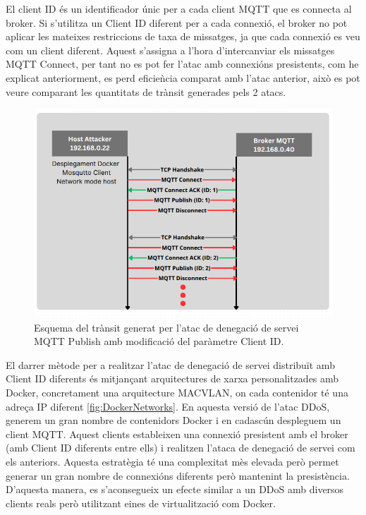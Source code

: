 El client ID és un identificador únic per a cada client MQTT que es connecta al broker. Si s'utilitza un Client ID diferent per a cada connexió, el broker no pot aplicar les mateixes restriccions de taxa de missatges, ja que cada connexió es veu com un client diferent. Aquest s'assigna a l'hora d'intercanviar els missatges MQTT Connect, per tant no es pot fer l'atac amb connexións presistents, com he explicat anteriorment, es perd eficieǹcia comparat amb l'atac anterior, això es pot veure comparant les quantitats de trànsit generades pels 2 atacs.   

  \begin{figure}[H]
    \centering
    \includegraphics[width=1\textwidth]{img/DoSclientID.png}
    \caption{Esquema del trànsit generat per l'atac de denegació de servei MQTT Publish amb modificació del paràmetre Client ID.}
    \label{fig:DoSclientId}
  \end{figure}

El darrer mètode per a realitzar l'atac de denegació de servei distribuït amb Client ID diferents és mitjançant arquitectures de xarxa personalitzades amb Docker, concretament una arquitecture MACVLAN, on cada contenidor té una adreça IP diferent \ref{fig:DockerNetworks}. En aquesta versió de l'atac DDoS, generem un gran nombre de contenidors Docker i en cadascún despleguem un client MQTT. Aquest clients estableixen una connexió presistent amb el broker (amb Client ID diferents entre ells) i realitzen l'ataca de denegació de servei com els anteriors. Aquesta estratègia té una complexitat mès elevada però permet generar un gran nombre de connexións diferents però mantenint la presistència. D'aquesta manera, es s'aconsegueix un efecte similar a un DDoS amb diversos clients reals però utilitzant eines de virtualització com Docker.


